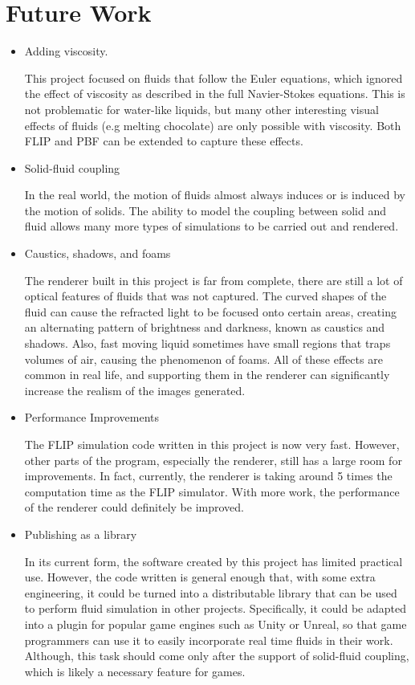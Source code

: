 \section{Future Work}
\label{section future work}
\begin{itemize}
    \item Adding viscosity.
    
    This project focused on fluids that follow the Euler equations, which ignored the effect of viscosity as described in the full Navier-Stokes equations. This is not problematic for water-like liquids, but many other interesting visual effects of fluids (e.g melting chocolate) are only possible with viscosity. Both FLIP and PBF can be extended to capture these effects.

    \item Solid-fluid coupling
    
    In the real world, the motion of fluids almost always induces or is induced by the motion of solids. The ability to model the coupling between solid and fluid allows many more types of simulations to be carried out and rendered. 

    \item Caustics, shadows, and foams
    
    The renderer built in this project is far from complete, there are still a lot of optical features of fluids that was not captured. The curved shapes of the fluid can cause the refracted light to be focused onto certain areas, creating an alternating pattern of brightness and darkness, known as caustics and shadows. Also, fast moving liquid sometimes have small regions that traps volumes of air, causing the phenomenon of foams. All of these effects are common in real life, and supporting them in the renderer can significantly increase the realism of the images generated.

    \item Performance Improvements
    
    The FLIP simulation code written in this project is now very fast. However, other parts of the program, especially the renderer, still has a large room for improvements. In fact, currently, the renderer is taking around 5 times the computation time as the FLIP simulator. With more work, the performance of the renderer could definitely be improved.


    \item Publishing as a library
    
    In its current form, the software created by this project has limited practical use. However, the code written is general enough that, with some extra engineering, it could be turned into a distributable library that can be used to perform fluid simulation in other projects. Specifically, it could be adapted into a plugin for popular game engines such as Unity or Unreal, so that game programmers can use it to easily incorporate real time fluids in their work. Although, this task should come only after the support of solid-fluid coupling, which is likely a necessary feature for games.
    
\end{itemize}

